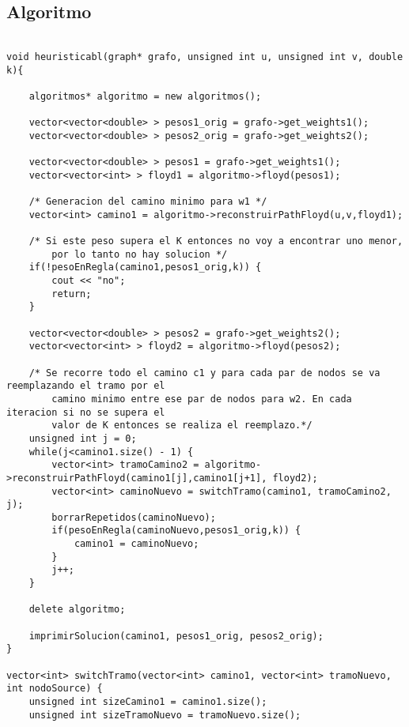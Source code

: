 \subsection{Algoritmo}
\begin{lstlisting}

void heuristicabl(graph* grafo, unsigned int u, unsigned int v, double k){
	
	algoritmos* algoritmo = new algoritmos();

	vector<vector<double> > pesos1_orig = grafo->get_weights1();
	vector<vector<double> > pesos2_orig = grafo->get_weights2();

	vector<vector<double> > pesos1 = grafo->get_weights1();
	vector<vector<int> > floyd1 = algoritmo->floyd(pesos1);

	/* Generacion del camino minimo para w1 */
	vector<int> camino1 = algoritmo->reconstruirPathFloyd(u,v,floyd1);

	/* Si este peso supera el K entonces no voy a encontrar uno menor,
		por lo tanto no hay solucion */
	if(!pesoEnRegla(camino1,pesos1_orig,k)) {
		cout << "no";
		return;
	}

	vector<vector<double> > pesos2 = grafo->get_weights2();
	vector<vector<int> > floyd2 = algoritmo->floyd(pesos2);
	
	/* Se recorre todo el camino c1 y para cada par de nodos se va reemplazando el tramo por el 
		camino minimo entre ese par de nodos para w2. En cada iteracion si no se supera el 
		valor de K entonces se realiza el reemplazo.*/
	unsigned int j = 0;
	while(j<camino1.size() - 1) {
		vector<int> tramoCamino2 = algoritmo->reconstruirPathFloyd(camino1[j],camino1[j+1], floyd2);
		vector<int> caminoNuevo = switchTramo(camino1, tramoCamino2, j);
		borrarRepetidos(caminoNuevo);
		if(pesoEnRegla(caminoNuevo,pesos1_orig,k)) {
			camino1 = caminoNuevo;
		}
		j++;
	}
	
	delete algoritmo;

	imprimirSolucion(camino1, pesos1_orig, pesos2_orig);
}

vector<int> switchTramo(vector<int> camino1, vector<int> tramoNuevo, int nodoSource) {
	unsigned int sizeCamino1 = camino1.size();
	unsigned int sizeTramoNuevo = tramoNuevo.size();


\end{lstlisting}
